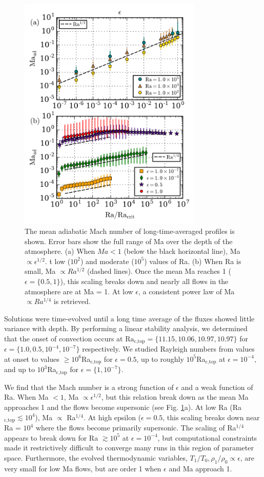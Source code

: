 \documentclass[aps, prl, twocolumn, nofootinbib, groupedaddress, amsfonts, amssymb, amsmath]{revtex4-1}
\begin{document}
\begin{figure}[t]
\includegraphics[width=3.4375in]{./figs/ma_v_Ra.png}
\caption{The mean adiabatic Mach number of long-time-averaged profiles
is shown.  Error bars show the full range of Ma over the depth of the
atmosphere.
(a) When $Ma < 1$ (below the black horizontal line), 
Ma $\propto \epsilon^{1/2}$.
t low ($10^2$) and moderate ($10^5$) values of Ra.
(b) When Ra is small, Ma $\propto Ra^{1/2}$ (dashed lines).
Once the mean Ma reaches 1 ($\epsilon = \{0.5, 1\}$), this scaling breaks down
and nearly all flows in the atmosphere are at Ma = 1.
At low $\epsilon$, a consistent power law of Ma $\propto Ra^{1/4}$ is retrieved.
\label{fig:ma_v_eps} }
\end{figure}


Solutions were time-evolved until a long time average of the fluxes
showed little
variance with depth. By performing a linear stability analysis, 
we determined that the onset of convection
occurs at $\text{Ra}_{\text{c,top}} = \{11.15, 10.06, 10.97, 10.97\}$ 
for $\epsilon = \{1.0, 0.5, 10^{-4}, 10^{-7}\}$ respectively.  
We studied Rayleigh
numbers from values at onset to values $\geq 10^6$Ra$_{\text{c,top}}$ 
for $\epsilon = 0.5$, up to
roughly $10^5$Ra$_{\text{c,top}}$ at $\epsilon = 10^{-4}$, and 
up to $10^3$Ra$_{\text{c,top}}$ for $\epsilon = \{1, 10^{-7}\}$.

We find that the Mach number is a strong function of 
$\epsilon$ and a weak function of Ra.  
When Ma $< 1$, Ma $\propto \epsilon^{1/2}$, 
but this relation break down as the mean
Ma approaches 1 and the flows become supersonic (see Fig. \ref{fig:ma_v_eps}a).  At low
Ra (Ra$_{\text{c,top}} \lesssim 10^4$), 
Ma $\propto$ Ra$^{1/4}$.  At high epsilon
($\epsilon = 0.5$, this scaling breaks down near 
Ra = $10^4$ where the flows become primarily
supersonic.  The scaling of 
Ra$^{1/4}$ appears to break down for Ra $\gtrsim 10^5$ at
$\epsilon = 10^{-4}$, 
but computational constraints made it restrictively difficult to converge
many runs in this region of parameter space.
Furthermore, the evolved thermodynamic variables, 
$T_1/T_0, \rho_1/\rho_0 \propto \epsilon$,
are very small for low Ma flows, 
but are order 1 when $\epsilon$ and Ma approach 1.
\end{document}
